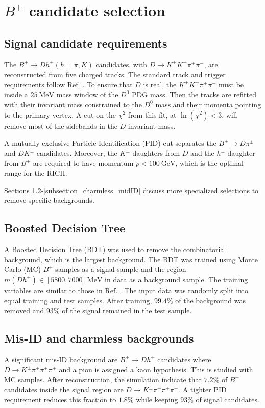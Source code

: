 \documentclass[12pt, a4paper, notitlepage, onecolumn]{article}
\numberwithin{equation}{section}
\begin{document}
\section{\texorpdfstring{$B^\pm$}{B} candidate selection}
\subsection{Signal candidate requirements}
\noindent The $B^\pm\to Dh^\pm (h = \pi, K)$ candidates, with $D\to K^+K^-\pi^+\pi^-$, are reconstructed from five charged tracks. The standard track and trigger requirements follow Ref. \cite{cite_LHCbGGSZKSpipi}. To ensure that $D$ is real, the $K^+K^-\pi^+\pi^-$ must be inside a $\SI{25}{\mega\eV}$ mass window of the $D^0$ PDG mass. Then the tracks are refitted with their invariant mass constrained to the $D^0$ mass and their momenta pointing to the primary vertex. A cut on the $\chi^2$ from this fit, at $\ln(\chi^2) < 3$, will remove most of the sidebands in the $D$ invariant mass.

A mutually exclusive Particle Identification (PID) cut separates the $B^\pm\to D\pi^\pm$ and $DK^\pm$ candidates. Moreover, the $K^\pm$ daughters from $D$ and the $h^\pm$ daughter from $B^\pm$ are required to have momentum $p < \SI{100}{\giga\eV}$, which is the optimal range for the RICH.

Sections \ref{subsection_BDT}-\ref{subsection_charmless_midID} discuss more specialized selections to remove specific backgrounds.

\subsection{Boosted Decision Tree}
\label{subsection_BDT}
\noindent A Boosted Decision Tree (BDT) was used to remove the combinatorial background, which is the largest background. The BDT was trained using Monte Carlo (MC) $B^\pm$ samples as a signal sample and the region $m(Dh^\pm)\in[5800, 7000]\si{\mega\eV}$ in data as a background sample. The training variables are similar to those in Ref. \cite{cite_LHCbGGSZKSpipi}. The input data was randomly split into equal training and test samples. After training, $99.4\%$ of the background was removed and $93\%$ of the signal remained in the test sample.

\subsection{Mis-ID and charmless backgrounds}
\label{subsection_charmless_misID}
\noindent A significant mis-ID background are $B^\pm\to Dh^\pm$ candidates where $D\to K^\pm\pi^\mp\pi^\pm\pi^\mp$ and a pion is assigned a kaon hypothesis. This is studied with MC samples. After reconstruction, the simulation indicate that $7.2\%$ of $B^\pm$ candidates inside the signal region are $D\to K^\pm\pi^\mp\pi^\pm\pi^\mp$. A tighter PID requirement reduces this fraction to $1.8\%$ while keeping $93\%$ of signal candidates.
\end{document}
